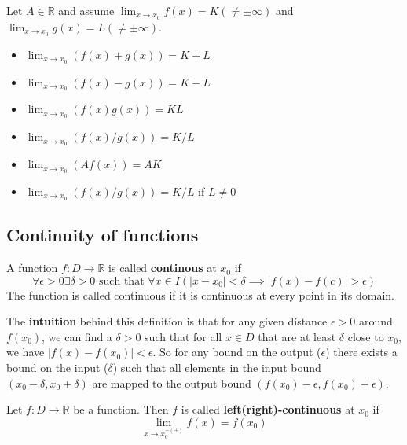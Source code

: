 \begin{theorem}
    Let $A \in \mathbb{R}$ and assume $\lim_{x \to x_0} f(x) = K (\neq \pm \infty)$ and $\lim_{x \to x_0} g(x) = L (\neq \pm \infty)$.
    \begin{itemize}
        \item $\lim_{x \to x_0} (f(x) + g(x)) = K + L$
        \item $\lim_{x \to x_0} (f(x) - g(x)) = K - L$
        \item $\lim_{x \to x_0} (f(x) g(x)) = K L$
        \item $\lim_{x \to x_0} (f(x) / g(x)) = K / L$
        \item $\lim_{x \to x_0} (A f(x)) = A K$
        \item $\lim_{x \to x_0} (f(x)/g(x)) = K/L$ if $L \neq 0$
    \end{itemize}
\end{theorem}

\subsection{Continuity of functions}

\begin{definition}
    A function $f: D \to \mathbb{R}$ is called \textbf{continous} at $x_0$ if
    $$\forall \epsilon \gt 0 \exists \delta \gt 0 \text{ such that } \forall x \in I (\mid x - x_0 \mid \lt \delta \implies \mid f(x) - f(c) \mid \gt \epsilon)$$
    The function is called continuous if it is continuous at every point in its domain.
\end{definition}

\begin{remark}
    The \textbf{intuition} behind this definition is that for any given distance $\epsilon > 0$ around $f(x_0)$, we can find a $\delta > 0$ such that for all $x \in D$ that are at least $\delta$ close to $x_0$, we have $|f(x) - f(x_0)| < \epsilon$. 
    So for any bound on the output ($\epsilon$) there exists a bound on the input ($\delta$) such that all elements in the input bound $(x_0 - \delta, x_0 + \delta)$ are mapped to the output bound $(f(x_0) - \epsilon, f(x_0) + \epsilon)$.
\end{remark}

\begin{definition}
    Let $f: D \to \mathbb{R}$ be a function. Then $f$ is called \textbf{left(right)-continuous} at $x_0$ if
    $$\lim_{x \to x_0^{-(+)}} f(x) = f(x_0)$$
\end{definition}

